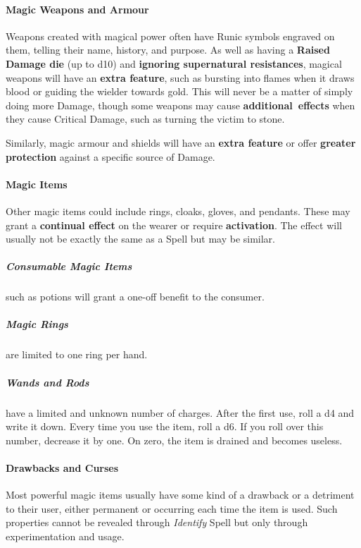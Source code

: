 \documentclass[itdr/core]{subfiles}
\begin{document}
\break

\paragraph{Magic Weapons and Armour}
Weapons created with magical power often have Runic symbols engraved on them, telling their name, history, and purpose. As well as having a \textbf{Raised Damage die} (up to d10) and \textbf{ignoring supernatural resistances}, magical weapons will have an \textbf{extra feature}, such as bursting into flames when it draws blood or guiding the wielder towards gold. This will never be a matter of simply \mbox{doing} more Damage, though some weapons may cause \mbox{\textbf{additional effects}} when they cause Critical Damage, such as turning the victim to stone.

Similarly, magic armour and shields will have an \textbf{extra feature} or offer \textbf{greater protection} against a specific source of Damage.

\vfill

\paragraph{Magic Items}
Other magic items could include rings, cloaks, gloves, and pendants. These may grant a \textbf{continual effect} on the wearer or require \textbf{activation}. The effect will usually not be exactly the same as a Spell but may be similar.

\vfill

\subparagraph{Consumable Magic Items} such as potions will grant a one-off benefit to the consumer.

\vfill

\subparagraph{Magic Rings} are limited to one ring per hand.

\vfill

\subparagraph{Wands and Rods} have a limited and unknown number of charges. After the first use, roll a d4 and write it down. Every time you use the item, roll a d6. If you roll over this number, decrease it by one. On zero, the item is drained and becomes useless.

\vfill

\paragraph{Drawbacks and Curses}
Most powerful magic items usually have some kind of a drawback or a detriment to their user, either \mbox{permanent} or occurring each time the item is used. Such properties cannot be revealed through \textit{Identify} Spell but only through experimentation and usage.
\end{document}
